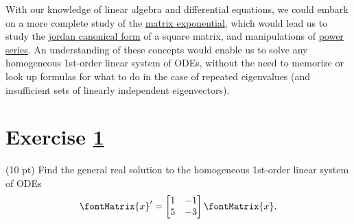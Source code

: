 {\begin{remark}
With our knowledge of linear algebra and differential equations, we could embark on a more complete study of the \href{https://en.wikipedia.org/wiki/Matrix\_exponential}{matrix exponential}, which would lead us to study the \href{https://en.wikipedia.org/wiki/Jordan\_normal\_form}{jordan canonical form} of a square matrix, and manipulations of \href{https://en.wikipedia.org/wiki/Power\_series}{power series}. An understanding of these concepts would enable us to solve any homogeneous 1st-order linear system of ODEs, without the need to memorize or look up formulas for what to do in the case of repeated eigenvalues (and insufficient sets of linearly independent eigenvectors).
\end{remark}}%





%
%
%
%



\section{Exercise \ref{sec : Math211 Summer2019 Exam4 Q9}}
\label{sec : Math211 Summer2019 Exam4 Q9}

(10 pt) Find the general real solution to the homogeneous 1st-order linear system of ODEs
\begin{align}
\fontMatrix{x}'
=
\begin{bmatrix}%
1	&	-1	\\
5	&	-3
\end{bmatrix}%
\fontMatrix{x}.%
\label{eq : E4Q9 ODE}
\end{align}




